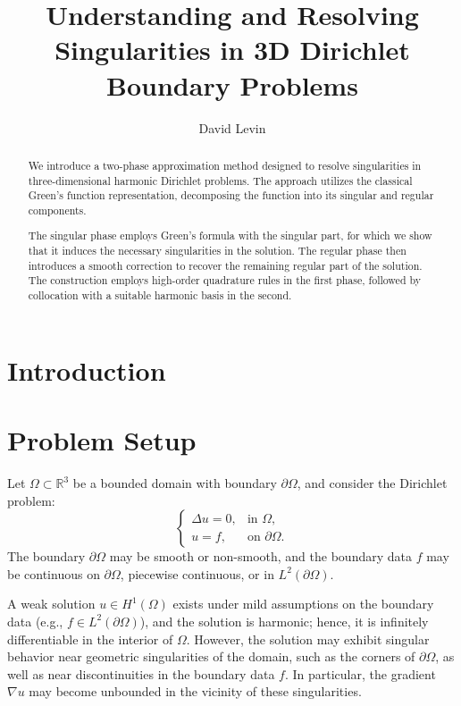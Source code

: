 \documentclass[12pt,oneside,reqno]{amsart}%
\theoremstyle{plain}
\numberwithin{equation}{section}
\begin{document}
\title{Understanding and Resolving Singularities in 3D Dirichlet Boundary Problems}
\author{  David Levin  }


\begin{abstract}

We introduce a two-phase approximation method designed to resolve singularities in three-dimensional harmonic Dirichlet problems.  The approach utilizes the classical Green's function representation, decomposing the function into its singular and regular components.

The singular phase employs Green’s formula with the singular part, for which we show that it induces the necessary singularities in the solution. The regular phase then introduces a smooth correction to recover the remaining regular part of the solution.
The construction employs high-order quadrature rules in the first phase, followed by collocation with a suitable harmonic basis in the second.

\end{abstract}
\maketitle

\section{Introduction}


\section*{Problem Setup}

Let \(\Omega \subset \mathbb{R}^3\) be a bounded domain with boundary \(\partial \Omega\), and consider the Dirichlet problem:
\[
\begin{cases}
\Delta u = 0, & \text{in } \Omega, \\
u = f, & \text{on } \partial \Omega.
\end{cases}
\]
The boundary $\partial\Omega$ may be smooth or non-smooth, and 
the boundary data \(f\) may be continuous on \(\partial \Omega\), piecewise continuous, or in \(L^2(\partial \Omega)\).

A weak solution \(u \in H^1(\Omega)\) exists under mild assumptions on the boundary data (e.g., \(f \in L^2(\partial \Omega)\)), and the solution is harmonic; hence, it is infinitely differentiable in the interior of \(\Omega\).
However, the solution may exhibit singular behavior near geometric singularities of the domain, such as the corners of $\partial\Omega$, as well as near discontinuities in the boundary data $f$. In particular, the gradient \(\nabla u\) may become unbounded in the vicinity of these singularities.
\end{document}
